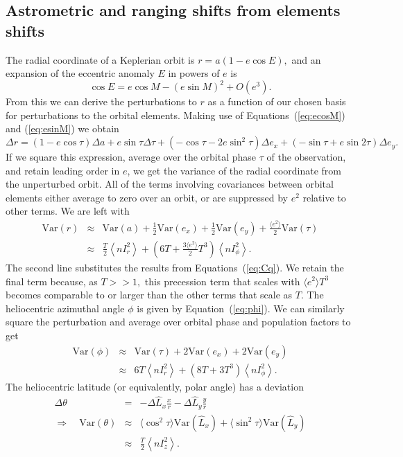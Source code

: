 \documentclass[linenumbers, onecolumn]{aastex631}
\newcommand{\eqq}[1]{Equation~(\ref{#1})}
\newcommand{\nIr}{\left\langle nI_r^2\right\rangle}
\newcommand{\nIphi}{\left\langle nI_\phi^2\right\rangle}
\newcommand{\nIz}{\left\langle nI_z^2\right\rangle}
\newcommand{\Var}{\textrm{Var}}
\newcommand{\Lhat}{\hat L}
\begin{document}
 \subsection{Astrometric and ranging shifts from elements shifts}
\label{sec:observe}
The radial coordinate of a Keplerian orbit is $r=a(1-e\cos E),$ and an expansion of the eccentric anomaly $E$ in powers of $e$ is
\begin{equation}
  \label{eq:Ee2}
  \cos E  =  e\cos M - (e \sin M)^2 + O(e^3).
\end{equation}
From this we can derive the perturbations to $r$ as a function of our chosen basis for perturbations to the orbital elements.  Making use of Equations~(\ref{eq:ecosM}) and (\ref{eq:esinM}) we obtain
\begin{equation}
  \Delta r = (1-e\cos\tau) \Delta a + e\sin\tau \Delta\tau +  (-\cos\tau -2e\sin^2\tau) \Delta e_x + (-\sin\tau+e\sin 2\tau) \Delta e_y.
\end{equation}
If we square this expression, average over the orbital phase $\tau$ of the observation, and retain leading order in $e$, we get the variance of the radial coordinate from the unperturbed orbit.  All of the terms involving covariances between orbital elements either average to zero over an orbit, or are suppressed by $e^2$ relative to other terms.  We are left with
\begin{eqnarray}
  \Var(r) & \approx & \Var(a) + \frac{1}{2}\Var(e_x) + \frac{1}{2}\Var(e_y) + \frac{\langle e^2\rangle}{2} \Var(\tau) \\
          & \approx & \frac{T}{2} \nIr + \left( 6T + \frac{3\langle e^2 \rangle}{2} T^3\right) \nIphi.
                      \label{eq:varr}
\end{eqnarray}
The second line substitutes the results from Equations~(\ref{eq:Cq}).  We retain the final term because, as $T>>1,$ this precession term that scales with $\langle e^2 \rangle T^3$ becomes comparable to or larger than the other terms that scale as $T$.  
The heliocentric azimuthal angle $\phi$ is given by \eqq{eq:phi}.  We can similarly square the perturbation and average over orbital phase and population factors to get
\begin{eqnarray}
  \Var(\phi) & \approx & \Var(\tau) + 2\Var(e_x) + 2\Var(e_y) \\
             & \approx & 6T\nIr + \left(8T+3T^3\right) \nIphi.
                         \label{eq:varphi}
\end{eqnarray}
The heliocentric latitude (or equivalently, polar angle) has a deviation
\begin{eqnarray}
  \Delta\theta & = & -\Delta\Lhat_x \frac{x}{r} - \Delta\Lhat_y \frac{y}{r} \\
  \Rightarrow \quad \Var(\theta) & \approx & \langle\cos^2\tau\rangle \Var(\Lhat_x) + \langle\sin^2\tau\rangle \Var(\Lhat_y) \\
               & \approx & \frac{T}{2} \nIz.
                           \label{eq:vartheta}
\end{eqnarray}
\end{document}
